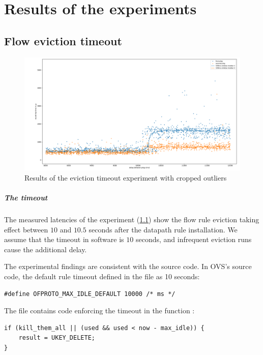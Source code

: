 \chapter{Results of the experiments}
\label{chap:exp}

\section{Flow eviction timeout}
\label{res:eviction-timeout}

\begin{figure}
    \centering
    \includegraphics[width=.9\linewidth]{img/randomized_eviction_timeout.pdf}
    \caption{Results of the eviction timeout experiment with cropped outliers}
    \label{fig:plot-eviction-timeout}
\end{figure}

\paragraph{The timeout} The measured latencies of the experiment (\cref{fig:plot-eviction-timeout}) show the flow rule eviction taking effect between $10$ and $10.5$ seconds after the datapath rule installation. We assume that the timeout in software is $10$ seconds, and infrequent eviction runs cause the additional delay.

The experimental findings are consistent with the source code. In OVS's source code, the default rule timeout defined in the file  as 10 seconds:
\begin{verbatim}
#define OFPROTO_MAX_IDLE_DEFAULT 10000 /* ms */
\end{verbatim}

The file  contains code enforcing the timeout in the function :

\begin{verbatim}
if (kill_them_all || (used && used < now - max_idle)) {
    result = UKEY_DELETE;
}
\end{verbatim}

